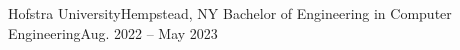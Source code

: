 \resumeSubheading
    {Hofstra University}{Hempstead, NY}
    {Bachelor of Engineering in Computer Engineering}{Aug. 2022 -- May 2023}